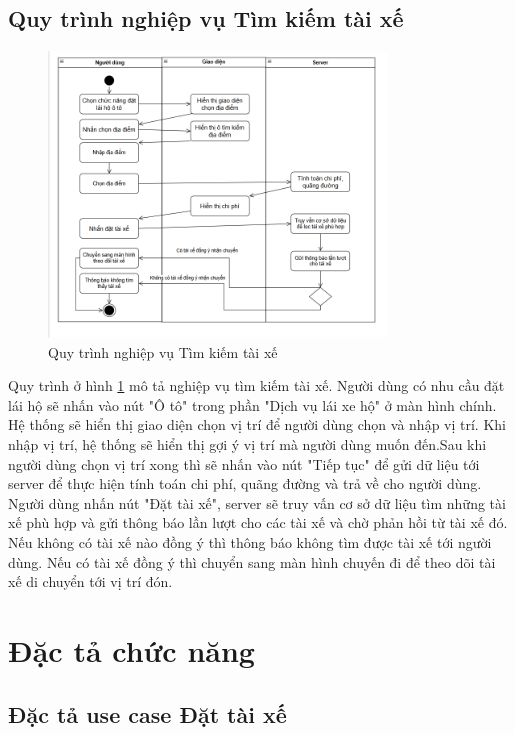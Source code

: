 \documentclass[../DoAn.tex]{subfiles}
\begin{document}
\subsection{Quy trình nghiệp vụ Tìm kiếm tài xế}
\label{subsection:2.2.6}
\begin{figure}[H]
  \centering
  \includegraphics[width=0.8\textwidth]{Hinhve/quy_trinh_nghiep_vu_tim_kiem_tai_xe.png}
  \caption{Quy trình nghiệp vụ Tìm kiếm tài xế}
  \label{fig:quy_trinh_nghiep_vu_tim_kiem_tai_xe}
\end{figure}
Quy trình ở hình \ref{fig:quy_trinh_nghiep_vu_tim_kiem_tai_xe} mô tả nghiệp vụ tìm kiếm tài xế.
Người dùng có nhu cầu đặt lái hộ sẽ nhấn vào nút "Ô tô" trong phần "Dịch vụ lái xe hộ"
ở màn hình chính. Hệ thống sẽ hiển thị giao diện chọn vị trí để người
dùng chọn và nhập vị trí. Khi nhập vị trí, hệ thống sẽ hiển thị gợi ý vị
trí mà người dùng muốn đến.Sau khi người dùng chọn vị trí xong thì sẽ nhấn vào nút 
"Tiếp tục" để gửi dữ liệu tới server để thực hiện tính toán chi phí, quãng đường và trả về cho người dùng.
Người dùng nhấn nút "Đặt tài xế", server sẽ truy vấn cơ sở dữ liệu tìm những tài xế
phù hợp và gửi thông báo lần lượt cho các tài xế và chờ phản hồi từ tài xế đó.
Nếu không có tài xế nào đồng ý thì thông báo không tìm được tài xế tới người dùng.
Nếu có tài xế đồng ý thì chuyển sang màn hình chuyến đi để theo dõi tài xế di chuyển tới vị trí đón.


\section{Đặc tả chức năng}
\label{section:2.3}
\subsection{Đặc tả use case Đặt tài xế}
\label{subsection:2.3.1}
\end{document}
